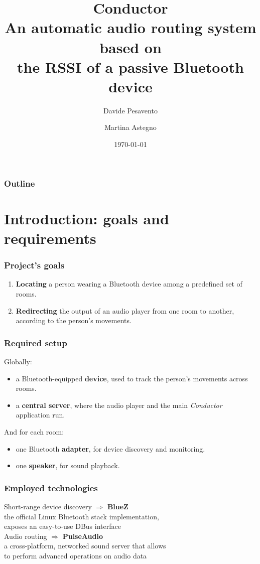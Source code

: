 \documentclass{beamer}
\title{\textbf{Conductor} \\
	An automatic audio routing system based on \\
	the RSSI of a passive Bluetooth device}
\author{Davide Pesavento \and Martina Astegno}
\institute{Università degli Studi di Padova \\
	Corso di Laurea Magistrale in Informatica}
\date{\today}
\begin{document}
\begin{frame}[plain]
\titlepage
\end{frame}

\begin{frame}
\frametitle{Outline}
\tableofcontents
\end{frame}


\section[Introduction]{Introduction: goals and requirements}

\begin{frame}
\frametitle{Project's goals}
\begin{enumerate}
	\pause
	\item \textbf{Locating} a person wearing a Bluetooth device among a predefined set of rooms.
	\pause\vspace{1cm}
	\item \textbf{Redirecting} the output of an audio player from one room to another, according to the person's movements.
\end{enumerate}
\end{frame}

\begin{frame}
\frametitle{Required setup}
Globally:
\begin{itemize}
	\item a Bluetooth-equipped \textbf{device}, used to track the person's movements across rooms.
	\item a \textbf{central server}, where the audio player and the main \textsl{Conductor} application run.
\end{itemize}
And for each room:
\begin{itemize}
	\item one Bluetooth \textbf{adapter}, for device discovery and monitoring.
	\item one \textbf{speaker}, for sound playback.
\end{itemize}
\end{frame}

\begin{frame}
\frametitle{Employed technologies}
\begin{center}
{\large Short-range device discovery $\Rightarrow$ \textbf{BlueZ}} \\\vspace{2mm}
{\footnotesize the official Linux Bluetooth stack implementation,\\exposes an easy-to-use DBus interface}
\\\vspace{1cm}
{\large Audio routing $\Rightarrow$ \textbf{PulseAudio}} \\\vspace{2mm}
{\footnotesize a cross-platform, networked sound server that allows\\to perform advanced operations on audio data}
\end{center}
\end{frame}
\end{document}
